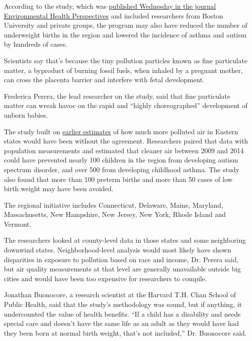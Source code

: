 According to the study, which was
\href{https://ehp.niehs.nih.gov/doi/full/10.1289/EHP6706}{published
Wednesday in the journal Environmental Health Perspectives} and included
researchers from Boston University and private groups, the program may
also have reduced the number of underweight births in the region and
lowered the incidence of asthma and autism by hundreds of cases.

Scientists say that's because the tiny pollution particles known as fine
particulate matter, a byproduct of burning fossil fuels, when inhaled by
a pregnant mother, can cross the placenta barrier and interfere with
fetal development.

Frederica Perera, the lead researcher on the study, said that fine
particulate matter can wreak havoc on the rapid and ``highly
choreographed'' development of unborn babies.

The study built on
\href{https://www.abtassociates.com/insights/publications/report/analysis-of-the-public-health-impacts-of-the-regional-greenhouse-gas}{earlier
estimates} of how much more polluted air in Eastern states would have
been without the agreement. Researchers paired that data with population
measurements and estimated that cleaner air between 2009 and 2014 could
have prevented nearly 100 children in the region from developing autism
spectrum disorder, and over 500 from developing childhood asthma. The
study also found that more than 100 preterm births and more than 50
cases of low birth weight may have been avoided.

The regional initiative includes Connecticut, Delaware, Maine, Maryland,
Massachusetts, New Hampshire, New Jersey, New York, Rhode Island and
Vermont.

The researchers looked at county-level data in those states and some
neighboring downwind states. Neighborhood-level analysis would most
likely have shown disparities in exposure to pollution based on race and
income, Dr. Perera said, but air quality measurements at that level are
generally unavailable outside big cities and would have been too
expensive for researchers to compile.

Jonathan Buonocore, a research scientist at the Harvard T.H. Chan School
of Public Health, said that the study's methodology was sound, but if
anything, it undercounted the value of health benefits. ``If a child has
a disability and needs special care and doesn't have the same life as an
adult as they would have had they been born at normal birth weight,
that's not included,'' Dr. Buonocore said.

